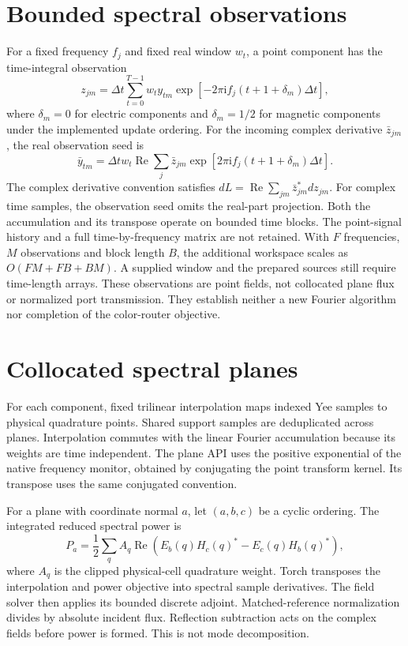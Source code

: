 \documentclass[11pt,a4paper]{article}
\begin{document}
\section{Bounded spectral observations}
For a fixed frequency $f_j$ and fixed real window $w_t$, a point component has
the time-integral observation
\begin{equation}
 z_{jm}=\Delta t\sum_{t=0}^{T-1}w_t y_{tm}
 \exp\left[-2\pi\mathrm{i}f_j(t+1+\delta_m)\Delta t\right],
\end{equation}
where $\delta_m=0$ for electric components and $\delta_m=1/2$ for magnetic
components under the implemented update ordering. For the incoming complex
derivative $\bar z_{jm}$, the real observation seed is
\begin{equation}
 \bar y_{tm}=\Delta t w_t\operatorname{Re}\sum_j
 \bar z_{jm}\exp\left[2\pi\mathrm{i}f_j(t+1+\delta_m)\Delta t\right].
\end{equation}
The complex derivative convention satisfies
$dL=\operatorname{Re}\sum_{jm}\bar z_{jm}^{*}dz_{jm}$.
For complex time samples, the observation seed omits the real-part projection.
Both the accumulation and its transpose operate on bounded time blocks.
The point-signal history and a full time-by-frequency matrix are not retained.
With $F$ frequencies, $M$ observations and block length $B$, the additional
workspace scales as $O(FM+FB+BM)$. A supplied window and the prepared sources
still require time-length arrays. These observations are point fields, not
collocated plane flux or normalized port transmission. They establish neither
a new Fourier algorithm nor completion of the color-router objective.

\section{Collocated spectral planes}
For each component, fixed trilinear interpolation maps indexed Yee samples to
physical quadrature points. Shared support samples are deduplicated across
planes. Interpolation commutes with the linear Fourier accumulation because
its weights are time independent. The plane API uses the positive exponential
of the native frequency monitor, obtained by conjugating the point transform
kernel. Its transpose uses the same conjugated convention.

For a plane with coordinate normal $a$, let $(a,b,c)$ be a cyclic ordering.
The integrated reduced spectral power is
\begin{equation}
 P_a=\frac{1}{2}\sum_q A_q\operatorname{Re}
 \left(E_b(q)H_c(q)^*-E_c(q)H_b(q)^*\right),
\end{equation}
where $A_q$ is the clipped physical-cell quadrature weight. Torch transposes
the interpolation and power objective into spectral sample derivatives.
The field solver then applies its bounded discrete adjoint. Matched-reference
normalization divides by absolute incident flux. Reflection subtraction acts
on the complex fields before power is formed. This is not mode decomposition.
\end{document}
